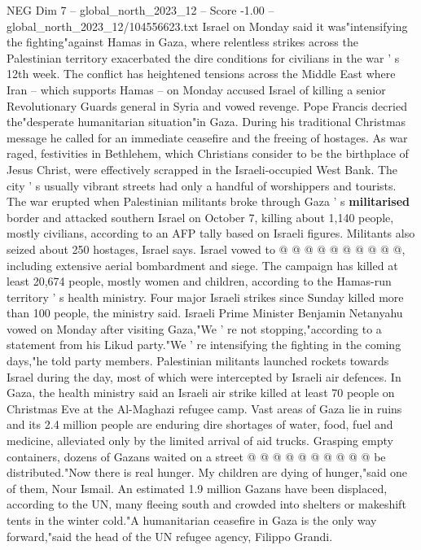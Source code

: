 \begin{textsample}{NEG Dim 7 – global\_north\_2023\_12 – Score -1.00 – global\_north\_2023\_12/104556623.txt}  \label{ex:f7_neg_304}
Israel on Monday said it was"intensifying the fighting"against Hamas in Gaza, where relentless strikes across the Palestinian territory exacerbated the dire conditions for civilians in the war ' s 12th week.
The conflict has heightened tensions across the Middle East where Iran -- which supports Hamas -- on Monday accused Israel of killing a senior Revolutionary Guards general in Syria and vowed revenge.
Pope Francis decried the"desperate humanitarian situation"in Gaza.
During his traditional Christmas message he called for an immediate ceasefire and the freeing of hostages.
As war raged, festivities in Bethlehem, which Christians consider to be the birthplace of Jesus Christ, were effectively scrapped in the Israeli-occupied West Bank.
The city ' s usually vibrant streets had only a handful of worshippers and tourists.
The war erupted when Palestinian militants broke through Gaza ' s \textbf{militarised} border and attacked southern Israel on October 7, killing about 1,140 people, mostly civilians, according to an AFP tally based on Israeli figures.
Militants also seized about 250 hostages, Israel says.
Israel vowed to @ @ @ @ @ @ @ @ @ @, including extensive aerial bombardment and siege.
The campaign has killed at least 20,674 people, mostly women and children, according to the Hamas-run territory ' s health ministry.
Four major Israeli strikes since Sunday killed more than 100 people, the ministry said.
Israeli Prime Minister Benjamin Netanyahu vowed on Monday after visiting Gaza,"We ' re not stopping,"according to a statement from his Likud party."We ' re intensifying the fighting in the coming days,"he told party members.
Palestinian militants launched rockets towards Israel during the day, most of which were intercepted by Israeli air defences.
In Gaza, the health ministry said an Israeli air strike killed at least 70 people on Christmas Eve at the Al-Maghazi refugee camp.
Vast areas of Gaza lie in ruins and its 2.4 million people are enduring dire shortages of water, food, fuel and medicine, alleviated only by the limited arrival of aid trucks.
Grasping empty containers, dozens of Gazans waited on a street @ @ @ @ @ @ @ @ @ @ be distributed."Now there is real hunger.
My children are dying of hunger,"said one of them, Nour Ismail.
An estimated 1.9 million Gazans have been displaced, according to the UN, many fleeing south and crowded into shelters or makeshift tents in the winter cold."A humanitarian ceasefire in Gaza is the only way forward,"said the head of the UN refugee agency, Filippo Grandi.

\end{textsample}
